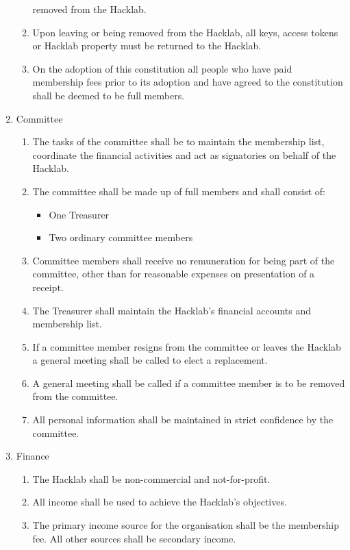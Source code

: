 \documentclass{article}
\begin{document}
\begin{enumerate}
\begin{enumerate}
      removed from the Hacklab.
    \item Upon leaving or being removed from the Hacklab, all keys,
      access tokens or Hacklab property must be returned to the Hacklab.
    \item On the adoption of this constitution all people who have
      paid membership fees prior to its adoption and have agreed to
      the constitution shall be deemed to be full members.
    \end{enumerate} %
  \item Committee
    \begin{enumerate}
    \item The tasks of the committee shall be to maintain the
      membership list, coordinate the financial activities and act as
      signatories on behalf of the Hacklab.
    \item The committee shall be made up of full members and shall consist of:
      \begin{itemize}
      \item One Treasurer
      \item Two ordinary committee members
      \end{itemize}
    \item Committee members shall receive no remuneration for being
      part of the committee, other than for reasonable expenses on
      presentation of a receipt.
    \item The Treasurer shall maintain the Hacklab's financial
      accounts and membership list.
    \item If a committee member resigns from the committee or leaves
      the Hacklab a general meeting shall be called to elect a
      replacement.
    \item A general meeting shall be called if a committee member is
      to be removed from the committee.
    \item All personal information shall be maintained in strict
      confidence by the committee.
    \end{enumerate} %
  \item Finance
    \begin{enumerate}
    \item The Hacklab shall be non-commercial and not-for-profit.
    \item All income shall be used to achieve the Hacklab's objectives.
    \item The primary income source for the organisation shall be
      the membership fee. All other sources shall be secondary income.

\end{enumerate}
\end{enumerate}
\end{document}

